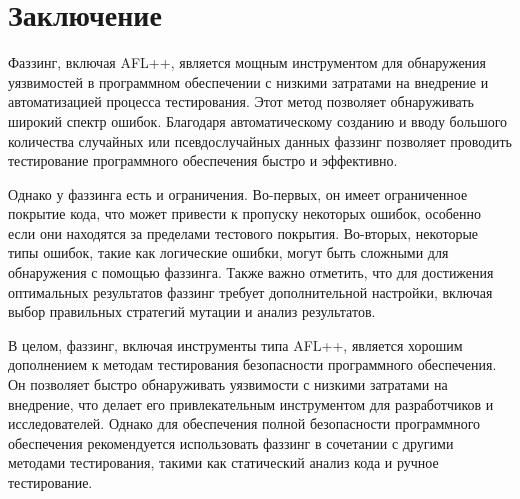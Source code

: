 \chapter*{Заключение} \label{ch-conclusion}

Фаззинг, включая AFL++, является мощным инструментом для обнаружения уязвимостей в программном обеспечении с низкими затратами на внедрение и автоматизацией процесса тестирования. Этот метод позволяет обнаруживать широкий спектр ошибок. Благодаря автоматическому созданию и вводу большого количества случайных или псевдослучайных данных фаззинг позволяет проводить тестирование программного обеспечения быстро и эффективно.

Однако у фаззинга есть и ограничения. Во-первых, он имеет ограниченное покрытие кода, что может привести к пропуску некоторых ошибок, особенно если они находятся за пределами тестового покрытия. Во-вторых, некоторые типы ошибок, такие как логические ошибки, могут быть сложными для обнаружения с помощью фаззинга. Также важно отметить, что для достижения оптимальных результатов фаззинг требует дополнительной настройки, включая выбор правильных стратегий мутации и анализ результатов.

В целом, фаззинг, включая инструменты типа AFL++, является хорошим  дополнением к методам тестирования безопасности программного обеспечения. Он позволяет быстро обнаруживать уязвимости с низкими затратами на внедрение, что делает его привлекательным инструментом для разработчиков и исследователей. Однако для обеспечения полной безопасности программного обеспечения рекомендуется использовать фаззинг в сочетании с другими методами тестирования, такими как статический анализ кода и ручное тестирование.
